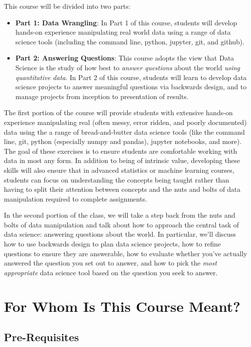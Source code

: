 \documentclass[12pt]{article}
\begin{document}
This course will be divided into two parts:

\begin{itemize}
	\item \textbf{Part 1: Data Wrangling}: In Part 1 of this course, students will develop hands-on experience manipulating real world data using a range of data science tools (including the command line, python, jupyter, git, and github).
	\item \textbf{Part 2: Answering Questions}: This course adopts the view that Data Science is the study of how best to \emph{answer questions} about the world \emph{using quantitative data}. In Part 2 of this course, students will learn to develop data science projects to answer meaningful questions via backwards design, and to manage projects from inception to presentation of results.
\end{itemize}

The first portion of the course will provide students with extensive hands-on experience manipulating real (often messy, error ridden, and poorly documented) data using the a range of bread-and-butter data science tools (like the command line, git, python (especially numpy and pandas), jupyter notebooks, and more). The goal of these exercises is to ensure students are comfortable working with data in most any form. In addition to being of intrinsic value, developing these skills will also ensure that in advanced statistics or machine learning courses, students can focus on understanding the concepts being taught rather than having to split their attention between concepts and the nuts and bolts of data manipulation required to complete assignments.

In the second portion of the class, we will take a step back from the nuts and bolts of data manipulation and talk about how to approach the central task of data science: answering questions about the world. In particular, we'll discuss how to use backwards design to plan data science projects, how to refine questions to ensure they are answerable, how to evaluate whether you've actually answered the question you set out to answer, and how to pick the \emph{most appropriate} data science tool based on the question you seek to answer.


\section{For Whom Is This Course Meant?}

\subsection{Pre-Requisites}
\end{document}
